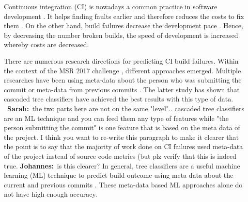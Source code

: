 \documentclass[sigplan, anonymous, review]{acmart}
\newcommand{\sn}[1]{{\color{blue}\textbf{Sarah:}~#1}}
\newcommand{\jk}[1]{{\color{violet}\textbf{Johannes:}~#1}}
\begin{document}
Continuous integration (CI) is nowadays a common practice in software development \cite{CI-Common}. It helps finding faults earlier and therefore reduces the costs to fix them \cite{NutzenCI}. On the other hand, build failures decrease the development pace \cite{Costs-BuildFailures}. Hence, by decreasing the number broken builds, the speed of development is increased whereby costs are decreased.

There are numerous research directions for predicting CI build failures. Within the context of the MSR 2017 challenge \cite{TravisTorrent}, different approaches emerged.
Multiple researches have been using meta-data about the person who was submitting the commit \cite{ContrInvolv} or meta-data from previous commits \cite{Pred-Cascade}. The latter study has shown that cascaded tree classifiers have achieved the best results with this type of data. ~\sn{the two parts here are not on the same "level".. cascaded tree classifiers are an ML technique and you can feed them any type of features while "the person submitting the commit" is one feature that is based on the meta data of the project. I think you want to re-write this paragraph to make it clearer that the point is to say that the majority of work done on CI failures used meta-data of the project instead of source code metrics (but plz verify that this is indeed true}. \jk{is this clearer?}
In general, tree classifiers are a useful machine learning (ML) technique to predict build outcome using meta data about the current and previous commits \cite{Pred-Tree}. 
These meta-data based ML approaches alone do not have high enough accuracy.
\end{document}

